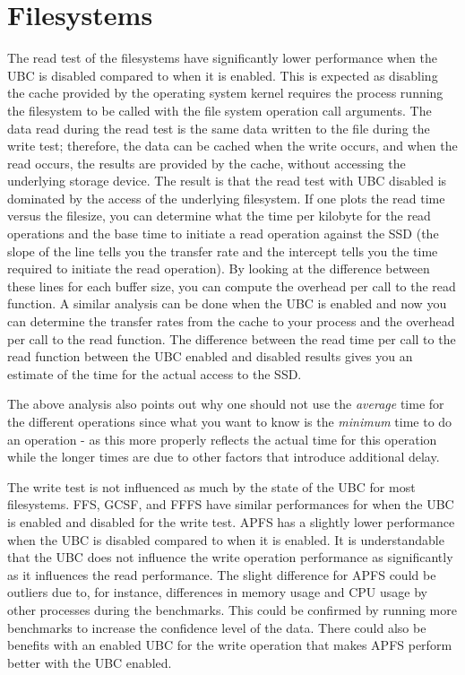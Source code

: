 \section{Filesystems}
\label{sec:dis_fs}

The read test of the filesystems have significantly lower performance when the \gls{UBC} is disabled compared to when it is enabled. This is expected as disabling the cache provided by the operating system kernel requires the process running the filesystem to be called with the file system operation call arguments. The data read during the read test is the same data written to the file during the write test; therefore, the data can be cached when the write occurs, and when the read occurs, the results are provided by the cache, \ie without accessing the underlying storage device. The result is that the read test with \gls{UBC} disabled is dominated by the access of the underlying filesystem. If one plots the read time versus the filesize, you can determine what the time per kilobyte for the read operations and the base time to initiate a read operation against the \gls{SSD} (\ie the slope of the line tells you the transfer rate and the intercept tells you the time required to initiate the read operation). By looking at the difference between these lines for each buffer size, you can compute the overhead per call to the read function. A similar analysis can be done when the \gls{UBC} is enabled and now you can determine the transfer rates from the cache to your process and the overhead per call to the read function. The difference between the read time per call to the read function between the \gls{UBC} enabled and disabled results gives you an estimate of the time for the actual access to the \gls{SSD}.

The above analysis also points out why one should not use the \textit{average} time for the different operations since what you want to know is the \textit{minimum} time to do an operation - as this more properly reflects the actual time for this operation while the longer times are due to other factors that introduce additional delay.

The write test is not influenced as much by the state of the \gls{UBC} for most filesystems. \gls{FFS}, \gls{GCSF}, and \gls{FFFS} have similar performances for when the \gls{UBC} is enabled and disabled for the write test. \gls{APFS} has a slightly lower performance when the \gls{UBC} is disabled compared to when it is enabled. It is understandable that the \gls{UBC} does not influence the write operation performance as significantly as it influences the read performance. The slight difference for \gls{APFS} could be outliers due to, for instance, differences in memory usage and CPU usage by other processes during the benchmarks. This could be confirmed by running more benchmarks to increase the confidence level of the data. There could also be benefits with an enabled \gls{UBC} for the write operation that makes \gls{APFS} perform better with the \gls{UBC} enabled.

